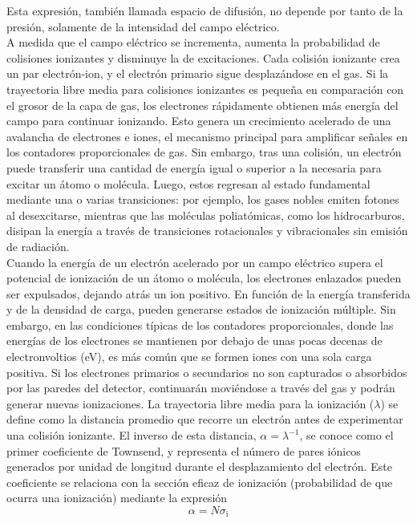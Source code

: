 \documentclass{article}
\begin{document}
\noindent Esta expresión, también llamada espacio de difusión, no depende por tanto de la presión, solamente de la intensidad del campo eléctrico.\\

\noindent A medida que el campo eléctrico se incrementa, aumenta la probabilidad de colisiones ionizantes y disminuye la de excitaciones. Cada colisión ionizante crea un par electrón-ion, y el electrón primario sigue desplazándose en el gas. Si la trayectoria libre media para colisiones ionizantes es pequeña en comparación con el grosor de la capa de gas, los electrones rápidamente obtienen más energía del campo para continuar ionizando. Esto genera un crecimiento acelerado de una avalancha de electrones e iones, el mecanismo principal para amplificar señales en los contadores proporcionales de gas. Sin embargo, tras una colisión, un electrón puede transferir una cantidad de energía igual o superior a la necesaria para excitar un átomo o molécula. Luego, estos regresan al estado fundamental mediante una o varias transiciones: por ejemplo, los gases nobles emiten fotones al desexcitarse, mientras que las moléculas poliatómicas, como los hidrocarburos, disipan la energía a través de transiciones rotacionales y vibracionales sin emisión de radiación.\\

\noindent Cuando la energía de un electrón acelerado por un campo eléctrico supera el potencial de ionización de un átomo o molécula, los electrones enlazados pueden ser expulsados, dejando atrás un ion positivo. En función de la energía transferida y de la densidad de carga, pueden generarse estados de ionización múltiple. Sin embargo, en las condiciones típicas de los contadores proporcionales, donde las energías de los electrones se mantienen por debajo de unas pocas decenas de electronvoltios (eV), es más común que se formen iones con una sola carga positiva. Si los electrones primarios o secundarios no son capturados o absorbidos por las paredes del detector, continuarán moviéndose a través del gas y podrán generar nuevas ionizaciones. La trayectoria libre media para la ionización ($\lambda$) se define como la distancia promedio que recorre un electrón antes de experimentar una colisión ionizante. El inverso de esta distancia, $\alpha = \lambda ^{-1}$, se conoce como el primer coeficiente de Townsend, y representa el número de pares iónicos generados por unidad de longitud durante el desplazamiento del electrón. Este coeficiente se relaciona con la sección eficaz de ionización (probabilidad de que ocurra una ionización) mediante la expresión 
\begin{equation}
    \alpha=N \sigma_{\mathrm{i}}
\end{equation}
\end{document}
